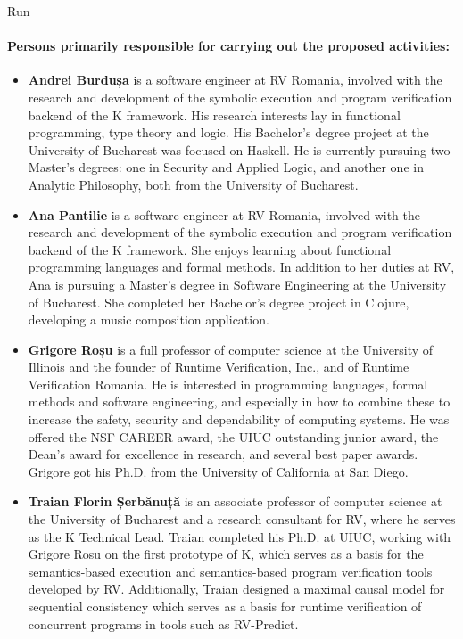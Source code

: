 \begin{sitedescription}{Run}

\paragraph{Persons primarily responsible for carrying out the proposed activities:}

\begin{itemize} %

\item{\bf Andrei Burdușa} is a software engineer at RV Romania, involved with the
research and development of the symbolic execution and program verification
backend of the K framework.
His research interests lay in functional programming, type theory and logic.
His Bachelor's degree project at the University of Bucharest was focused on Haskell.
He is currently pursuing two Master’s degrees: one in Security and Applied Logic,
and another one in Analytic Philosophy, both from the University of Bucharest.

\item{\bf Ana Pantilie} is a software engineer at RV Romania, involved with the
research and development of the symbolic execution and program verification
backend of the K framework.
She enjoys learning about functional programming languages and formal methods.
In addition to her duties at RV, Ana is pursuing a Master's degree in Software
Engineering at the University of Bucharest.
She completed her Bachelor's degree project in Clojure, developing a music
composition application.

\item{\bf Grigore Roșu} is a full professor of computer science at the
University of Illinois and the founder of Runtime Verification, Inc., and of 
Runtime Verification Romania. He is interested in programming languages,
formal methods and software engineering, and especially in how to combine
these to increase the safety, security and dependability of computing systems.
He was offered the NSF CAREER award, the UIUC outstanding junior award,
the Dean's award for excellence in research, and several best paper awards.
Grigore got his Ph.D. from the University of California at San Diego.

\item{\bf Traian Florin Șerbănuță} is an associate professor of computer science
at the University of Bucharest and a research consultant for RV, where he serves
as the K Technical Lead.
Traian completed his Ph.D. at UIUC, working with Grigore Rosu
on the first prototype of K, which serves as a basis for the semantics-based execution
and semantics-based program verification tools developed by RV.
Additionally, Traian designed a maximal causal model for sequential consistency
which serves as a basis for runtime verification of concurrent programs in tools
such as RV-Predict.

\end{itemize}

\end{sitedescription}

